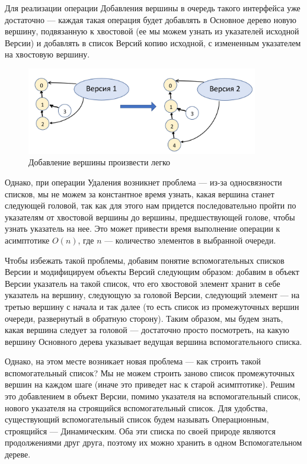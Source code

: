 \documentclass[a4paper,12pt]{extarticle}
\begin{document}
Для реализации операции Добавления вершины в очередь такого интерфейса уже достаточно — каждая такая операция будет добавлять в Основное дерево новую вершину, подвязанную к хвостовой (ее мы можем узнать из указателей исходной Версии) и добавлять в список Версий копию исходной, с измененным указателем на хвостовую вершину.\\
\begin{figure}[h!]
	\centering
	\includegraphics[width=0.9\textwidth]{content/2_img.jpg}
	\caption{Добавление вершины произвести легко}
	\label{insertion}
\end{figure}\par
Однако, при операции Удаления возникнет проблема — из-за односвязности списков, мы не можем за константное время узнать, какая вершина станет следующей головой, так как для этого нам придется последовательно пройти по указателям от хвостовой вершины до вершины, предшествующей голове, чтобы узнать указатель на нее. Это может привести время выполнение операции к асимптотике $O(n)$, где $n$ — количество элементов в выбранной очереди.\par
Чтобы избежать такой проблемы, добавим понятие вспомогательных списков Версии и модифицируем объекты Версий следующим образом: добавим в объект Версии указатель на такой список, что его хвостовой элемент хранит в себе указатель на вершину, следующую за головой Версии, следующий элемент — на третью вершину с начала и так далее (то есть список из промежуточных вершин очереди, развернутый в обратную сторону). Таким образом, мы будем знать, какая вершина следует за головой — достаточно просто посмотреть, на какую вершину Основного дерева указывает ведущая вершина вспомогательного списка.\par
Однако, на этом месте возникает новая проблема — как строить такой вспомогательный список? Мы не можем строить заново список промежуточных вершин на каждом шаге (иначе это приведет нас к старой асимптотике). Решим это добавлением в объект Версии, помимо указателя на вспомогательный список, нового указателя на строящийся вспомогательный список. Для удобства, существующий вспомогательный список будем называть Операционным, строящийся — Динамическим. Оба эти списка по своей природе являются продолжениями друг друга, поэтому их можно хранить в одном Вспомогательном дереве.\par
\end{document}
